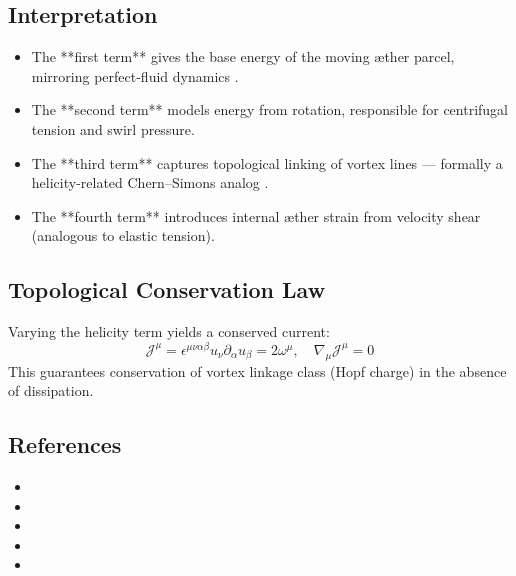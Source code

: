 \documentclass[twocolumn,aps,pre,floatfix,nofootinbib]{revtex4-2}
\begin{document}
    \subsection*{Interpretation}

    \begin{itemize}
        \item The **first term** gives the base energy of the moving æther parcel, mirroring perfect-fluid dynamics \cite{schutz1970perfect}.
        \item The **second term** models energy from rotation, responsible for centrifugal tension and swirl pressure.
        \item The **third term** captures topological linking of vortex lines — formally a helicity-related Chern–Simons analog \cite{moffatt1969degree, arnold1998topological}.
        \item The **fourth term** introduces internal æther strain from velocity shear (analogous to elastic tension).
    \end{itemize}

    \subsection*{Topological Conservation Law}

    Varying the helicity term yields a conserved current:
    \[
        \mathcal{J}^\mu = \epsilon^{\mu\nu\alpha\beta} u_\nu \partial_\alpha u_\beta = 2 \omega^\mu,
        \quad \nabla_\mu \mathcal{J}^\mu = 0
    \]
    This guarantees conservation of vortex linkage class (Hopf charge) in the absence of dissipation.

    \subsection*{References}

    \begin{itemize}
        \item {}  %
        \item {} %
        \item {} %
        \item {} %
        \item {} %
    \end{itemize}
\end{document}
